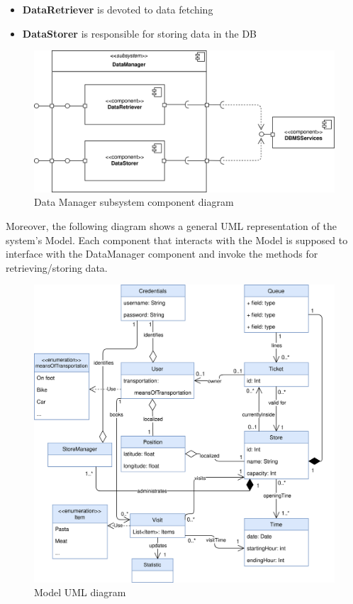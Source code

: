 \documentclass[]{article}
\begin{document}
		\begin{itemize}
		
			\item \textbf{DataRetriever} is devoted to data fetching
			\item \textbf{DataStorer} is responsible for storing data in the DB
		\end{itemize}
		
			\begin{figure}[H]
			\centering
			\includegraphics[scale=0.9]{ComponentView/DataManagerComponent.png}
			\caption{Data Manager subsystem component diagram}
			\label{fig:DataManagerDiagram}
		\end{figure}
		
	\bigskip
	Moreover, the following diagram shows a general UML representation of the system's Model. \newline
	Each component that interacts with the Model is supposed to interface with the DataManager component and invoke the methods for retrieving/storing data. \newline
	
	\begin{figure}[H]
			\centering
			\includegraphics[scale=0.73]{ComponentView/umlDD.png}
			\caption{Model UML diagram}
			\label{fig:ModelUML}
		\end{figure}
	
\end{document}
